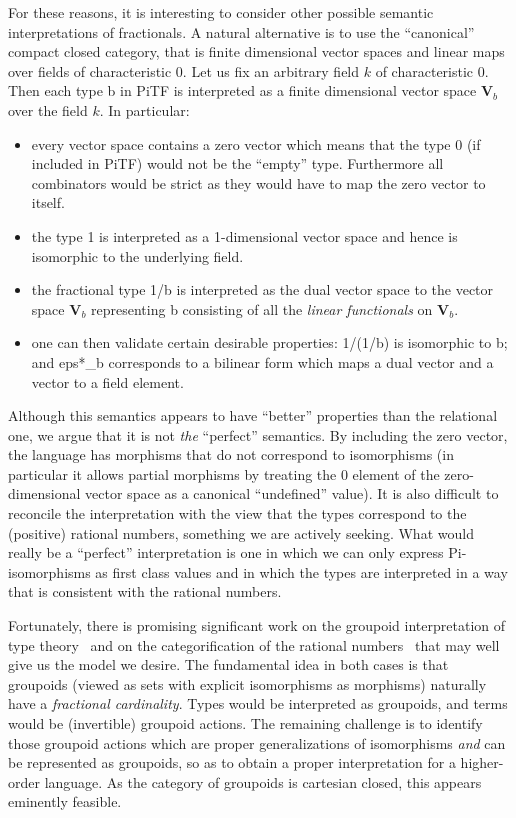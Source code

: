 \documentclass{llncs}
\begin{document}
For these reasons, it is interesting to consider other possible semantic
interpretations of fractionals. A natural alternative is to use the
``canonical'' compact closed category, that is finite dimensional vector
spaces and linear maps\cite{Selinger:2011:FDH:1942319.1942398,Hasegawa:2008:FDV:1805839.1805859} over fields of characteristic $0$. Let us fix an arbitrary
field $k$ of characteristic $0$.
Then each type {{b}} in {{PiTF}} is interpreted as a finite dimensional
  vector space $\mathbf{V}_b$ over the field $k$. In particular:
\begin{itemize}
  \item every vector space contains a zero vector which means that the type
    {{0}} (if included in {{PiTF}}) would not be the ``empty'' type.
    Furthermore all combinators would be
    strict as they would have to map the zero vector to itself. 
  \item the type {{1}} is interpreted as a 1-dimensional vector space and hence
    is isomorphic to the underlying field.
  \item the fractional type {{1/b}} is interpreted as the dual vector space
    to the vector space $\mathbf{V}_b$ representing {{b}} consisting of all
    the \emph{linear functionals} on $\mathbf{V}_b$.
  \item one can then validate certain desirable properties: {{1/(1/b)}} is
    isomorphic to {{b}}; and {{eps*_b}} corresponds to a bilinear form which
    maps a dual vector and a vector to a field element.
\end{itemize}

Although this semantics appears to have ``better'' properties than the
relational one, we argue that it is not \emph{the} ``perfect'' semantics. By
including the zero vector, the language has
morphisms that do not correspond to isomorphisms (in particular it allows
partial morphisms by treating the {{0}} element of the zero-dimensional 
vector space as a canonical ``undefined'' value).  It is also difficult to
reconcile the interpretation with the view that the types correspond
to the (positive) rational numbers, something we are actively seeking. What 
would really be a ``perfect'' interpretation is one in which we
can only express {{Pi}}-isomorphisms as first class values and in which the
types are interpreted in a way that is consistent with the rational
numbers. 

Fortunately, there is promising significant work on the groupoid
interpretation of type theory~\cite{Hofmann96thegroupoid} and on the 
categorification of the rational numbers~\cite{math/9802029} that may well give
us the model we desire.  The fundamental idea in both cases is that groupoids
(viewed as sets with explicit isomorphisms as morphisms) naturally have a
\emph{fractional cardinality}.  Types would be interpreted as groupoids, and
terms would be (invertible) groupoid actions.  The remaining challenge is to
identify those groupoid actions which are proper generalizations of
isomorphisms \emph{and} can be represented as groupoids, so as to obtain a
proper interpretation for a higher-order language.  As the category of
groupoids is cartesian closed, this appears eminently feasible.


 

\end{document}
